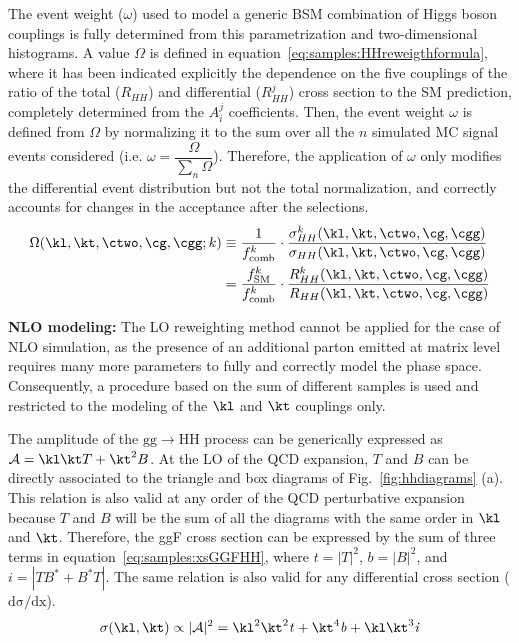 The event weight ($\omega$) used to model a generic BSM combination of Higgs boson couplings is fully determined from this parametrization and two-dimensional histograms. A value $\Omega$ is defined in equation~\ref{eq:samples:HHreweigthformula}, where it has been indicated explicitly the dependence on the five couplings of the ratio of the total ($R_{HH}$) and differential ($R_{HH}^j$) cross section to the SM prediction, completely determined from the $A_i^j$ coefficients. Then, the event weight $\omega$ is defined from $\Omega$ by normalizing it to the sum over all the $n$ simulated MC signal events considered (i.e. $\omega = \dfrac{\Omega}{\sum_n \Omega}$).  Therefore, the application of $\omega$ only modifies the differential event distribution but not the total normalization, and correctly accounts for changes in the acceptance after the selections.
\begin{equation}
\label{eq:samples:HHreweigthformula}
\begin{split}
\Omega(\kl, \kt, \ctwo, \cg, \cgg; k) & \equiv \dfrac{1}{f^k_\text{comb}} \cdot \dfrac{\sigma^k_{HH} (\kl, \kt, \ctwo, \cg, \cgg)}{\sigma_{HH} (\kl, \kt, \ctwo, \cg, \cgg)} \\
& = \dfrac{f^k_\text{SM}}{f^k_\text{comb}} \cdot \dfrac{R_{HH}^k (\kl, \kt, \ctwo, \cg, \cgg)}{R_{HH} (\kl, \kt, \ctwo, \cg, \cgg)}
\end{split}
\end{equation}

{\bf{NLO modeling:}}  The LO reweighting method cannot be applied for the case of NLO simulation, as the presence of an additional parton emitted at matrix level requires many more parameters to fully and correctly model the phase space. Consequently, a procedure based on the sum of different samples is used and restricted to the modeling of the $\kl$ and $\kt$ couplings only. 

The amplitude of the $\mathrm{gg\to HH}$ process can be generically expressed as $\mathcal{A} = \kl\kt T + \kt^2 B$. At the LO of the QCD expansion, $T$ and $B$ can be directly associated to the triangle and box diagrams of Fig.~\ref{fig:hhdiagrams} (a). This relation is also valid at any order of the QCD perturbative expansion because $T$ and $B$ will be the sum of all the diagrams with the same order in $\kl$ and $\kt$. Therefore, the ggF cross section can be expressed by the sum of three terms in equation~\ref{eq:samples:xsGGFHH}, where $\mathit{t} = |T|^2$, $\mathit{b} = |B|^2$, and $\mathit{i} = |T B^* + B^* T|$. The same relation is also valid for any differential cross section ($\mathrm{d\sigma/dx}$).
\begin{equation}
\label{eq:samples:xsGGFHH}
\sigma(\kl, \kt) \propto |\mathcal{A}|^2 = \kl^2\kt^2 \mathit{t} + \kt^4 \mathit{b} + \kl\kt^3 \mathit{i}
\end{equation}


